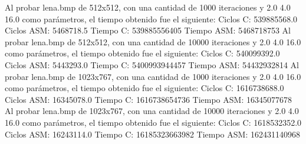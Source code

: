 \documentclass[10pt, a4paper]{article}
\begin{document}
\begin{itemize}
\newline
Al probar lena.bmp de 512x512, con una cantidad de 1000 iteraciones y 2.0 4.0 16.0 como parámetros, el tiempo obtenido fue el siguiente:\newline
Ciclos C:                 539885568.0\newline
Ciclos ASM:               5468718.5\newline
\newline
Tiempo C:                 539885556405\newline
Tiempo ASM:               5468718753\newline
\newline
Al probar lena.bmp de 512x512, con una cantidad de 10000 iteraciones y 2.0 4.0 16.0 como parámetros, el tiempo obtenido fue el siguiente:\newline
Ciclos C:                 540099392.0\newline
Ciclos ASM:               5443293.0\newline
\newline
Tiempo C:                 5400993944457\newline
Tiempo ASM:               54432932814\newline
\newline
Al probar lena.bmp de 1023x767, con una cantidad de 1000 iteraciones y 2.0 4.0 16.0 como parámetros, el tiempo obtenido fue el siguiente:\newline
Ciclos C:                 1616738688.0\newline
Ciclos ASM:               16345078.0\newline
\newline
Tiempo C:                 1616738654736\newline
Tiempo ASM:               16345077678\newline
\newline
Al probar lena.bmp de 1023x767, con una cantidad de 10000 iteraciones y 2.0 4.0 16.0 como parámetros, el tiempo obtenido fue el siguiente:\newline
Ciclos C:                 1618532352.0\newline
Ciclos ASM:               16243114.0\newline
\newline
Tiempo C:                 16185323663982\newline
Tiempo ASM:               162431140968\newline



\end{itemize}
\end{document}
